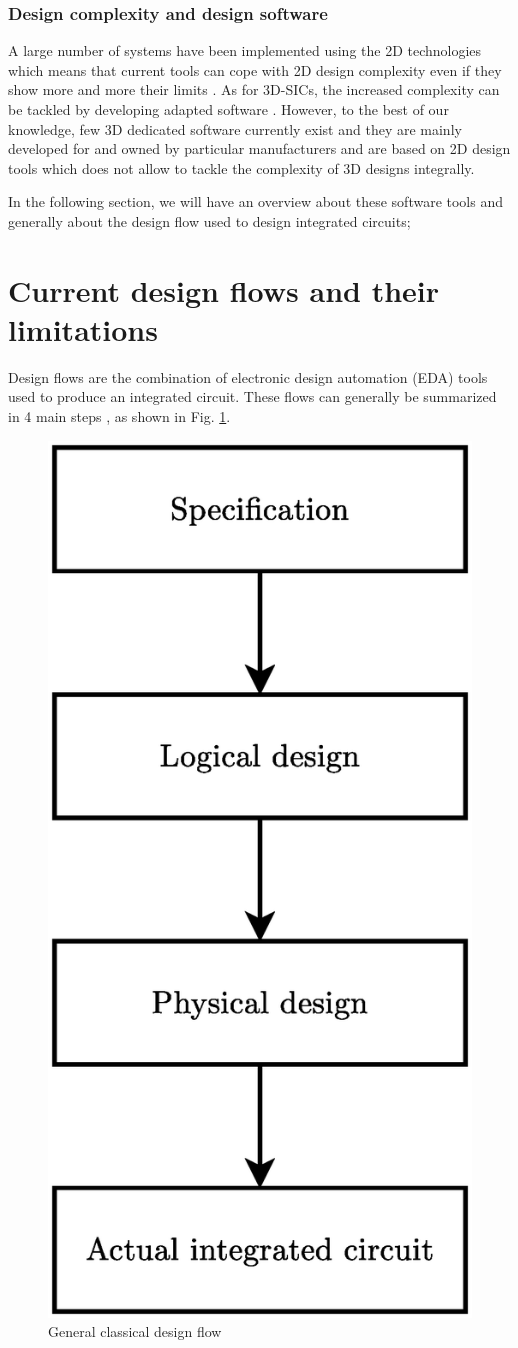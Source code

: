 \subsubsection{Design complexity and design software}
A large number of systems have been implemented using the 2D technologies which means that current tools can cope with 2D design complexity even if they show more and more their limits \cite{vanderbiest06, PFF10}. As for 3D-SICs, the increased complexity can be tackled by developing adapted software \cite{659500}. However, to the best of our knowledge, few 3D dedicated software currently exist and they are mainly developed for and owned by particular manufacturers and are based on 2D design tools which does not allow to tackle the complexity of 3D designs integrally.

In the following section, we will have an overview about these software tools and generally about the design flow used to design integrated circuits;

\section{Current design flows and their limitations}

Design flows are the combination of electronic design automation (EDA) tools used to produce an integrated circuit. These flows can generally be summarized in 4 main steps \cite{coursefred}, as shown in Fig. \ref{fig:designflow}.

\begin{figure}[h!]
\begin{center}
\includegraphics[width=0.35\linewidth]{designflow.eps}
\end{center}
\vspace{-0.5cm}
\caption{General classical design flow}
\label{fig:designflow}
\end{figure}


